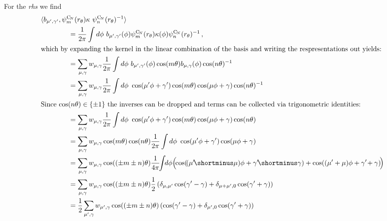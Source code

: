 \documentclass{article}
\newcommand{\lp}{\left(}
\newcommand{\rp}{\right)}
\newcommand{\CN}{\ensuremath{\operatorname{C}_{\!N}}}
\begin{document}
For the \textit{rhs} we find
\begin{align*}
	&\langle b_{\mu',\gamma'},  \psi_m^{\CN}(r_\theta)\kappa\ \psi_n^{\CN}(r_\theta)^{-1} \rangle && \\
	&\qquad\qquad= {1\over2\pi}\int d\phi \ b_{\mu',\gamma'}(\phi) \psi_m^{\CN}(r_\theta)\kappa(\phi)\psi_n^{\CN}(r_\theta)^{-1} \,, && \\
\intertext{which by expanding the kernel in the linear combination of the basis and writing the respresentations out yields:}
	&\qquad\qquad= \sum_{\mu, \gamma} w_{\mu, \gamma} {1\over2\pi}\int d\phi \ b_{\mu',\gamma'}(\phi) \cos(m\theta) b_{\mu,\gamma}(\phi) \cos(n\theta)^{-1} && \\
	&\qquad\qquad= \sum_{\mu, \gamma} w_{\mu, \gamma} {1\over2\pi}\int d\phi \ \cos(\mu'\phi + \gamma') \cos(m\theta) \cos(\mu\phi + \gamma) \cos(n\theta)^{-1} && \\
\intertext{Since $\cos(n\theta)\in\{\pm 1\}$ the inverses can be dropped and terms can be collected via trigonometric identities:}
	&\qquad\qquad= \sum_{\mu, \gamma} w_{\mu, \gamma} {1\over2\pi}\int d\phi \ \cos(\mu'\phi + \gamma') \cos(m\theta) \cos(\mu\phi + \gamma) \cos(n\theta) && \\
	&\qquad\qquad= \sum_{\mu, \gamma} w_{\mu, \gamma} \cos(m\theta) \cos(n\theta) {1\over2\pi}\int d\phi \ \cos(\mu'\phi + \gamma')  \cos(\mu\phi + \gamma) && \\
	&\qquad\qquad= \sum_{\mu, \gamma} w_{\mu, \gamma} \cos((\pm m \pm n) \theta) {1\over4\pi}\!\! \int\!\! d\phi  \Big(\!\! \cos(\!(\mu'\!\shortminus \mu)\phi + \gamma'\!\shortminus\gamma) + \cos((\mu' + \mu)\phi + \gamma'\!+\gamma) \!\Big) && \\
	&\qquad\qquad= \sum_{\mu, \gamma} w_{\mu, \gamma} \cos((\pm m \pm n) \theta) {1\over2} \lp \delta_{\mu, \mu'}\cos(\gamma'-\gamma) + \delta_{\mu+\mu', 0}\cos(\gamma'+\gamma) \rp && \\
	&\qquad\qquad= {1\over2} \sum_{\mu', \gamma} w_{\mu', \gamma} \cos((\pm m \pm n) \theta) \lp \cos(\gamma'-\gamma) + \delta_{\mu', 0}\cos(\gamma'+\gamma) \rp && 
\end{align*}
\end{document}
